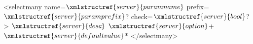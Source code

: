 <selectmany name=$\xmlstructref{server}{paramname}$ prefix=$\xmlstructref{server}{paramprefix}$? check=$\xmlstructref{server}{bool}$? >
  $\xmlstructref{server}{desc}$
  $\xmlstructref{server}{option}$+
  $\xmlstructref{server}{defaultvalue}$*
</selectmany>

